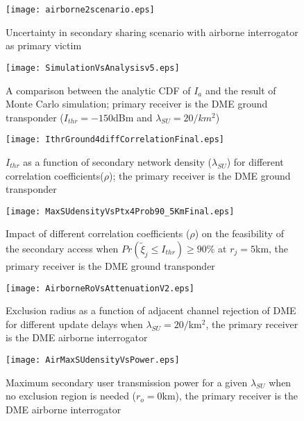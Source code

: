 \documentclass[12pt,submission,journal,onecolumn]{IEEEtran}
\begin{document}
\begin{figure}[ht]
  \centering \texttt{[image: airborne2scenario.eps]}\\
  \centering \caption{Uncertainty in secondary sharing scenario with airborne interrogator as primary victim}
  \label{fig:AirborneScenario}
\end{figure}

\begin{figure}[h]
  \centering \texttt{[image: SimulationVsAnalysisv5.eps]}\\
  \centering \caption{A comparison between the analytic CDF of $I_{a}$ and the result of Monte Carlo simulation; primary receiver is the DME ground transponder ($I_{thr}=-150$dBm and $\lambda_{SU}=20/km^2$)}
 \label{fig:SimulationVsAnalysis}
\end{figure}

\begin{figure}[h]
  \centering \texttt{[image: IthrGround4diffCorrelationFinal.eps]}\\
  \centering \caption{$I_{thr}$ as a function of secondary network density ($\lambda_{SU}$) for different correlation coefficients($\rho$); the primary receiver is the DME ground transponder}
  \label{fig:IthrDiffCorrelation}
\end{figure}

\begin{figure}[h]
 \centering \texttt{[image: MaxSUdensityVsPtx4Prob90\_5KmFinal.eps]}\\
  \centering \caption{Impact of different correlation coefficients ($\rho$) on the feasibility of the secondary access when $Pr(\tilde{\xi}_{j}\leq I_{thr})\geq 90\%$ at $r_{j}=5$km, the primary receiver is the DME ground transponder}
  \label{fig:MaxSUdensity}
\end{figure}
\begin{figure}[h]
  \centering \texttt{[image: AirborneRoVsAttenuationV2.eps]}\\
  \centering \caption{Exclusion radius as a function of adjacent channel rejection of DME for different update delays when $\lambda_{SU}=20/$km$^2$, the primary receiver is the DME airborne interrogator}
  \label{fig:AirborneRoVsDensity}
\end{figure}

\begin{figure}[h]
  \centering \texttt{[image: AirMaxSUdensityVsPower.eps]}\\
  \centering \caption{Maximum secondary user transmission power for a given $\lambda_{SU}$ when no exclusion region is needed ($r_o = 0$km), the primary receiver is the DME airborne interrogator}
  \label{fig:AirPowerVsDensity}
\end{figure}
\end{document}
